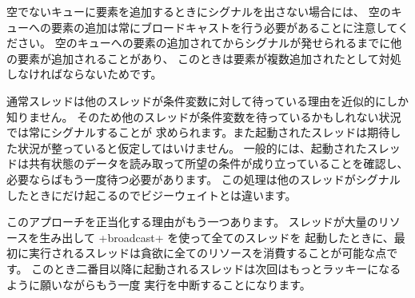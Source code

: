 空でないキューに要素を追加するときにシグナルを出さない場合には、
空のキューへの要素の追加は常にブロードキャストを行う必要があることに注意してください。
空のキューへの要素の追加されてからシグナルが発せられるまでに他の要素が追加されることがあり、
このときは要素が複数追加されたとして対処しなければならないためです。

通常スレッドは他のスレッドが条件変数に対して待っている理由を近似的にしか知りません。
そのため他のスレッドが条件変数を待っているかもしれない状況では常にシグナルすることが
求められます。また起動されたスレッドは期待した状況が整っていると仮定してはいけません。
一般的には、起動されたスレッドは共有状態のデータを読み取って所望の条件が成り立っていることを確認し、
必要ならばもう一度待つ必要があります。
この処理は他のスレッドがシグナルしたときにだけ起こるのでビジーウェイトとは違います。

このアプローチを正当化する理由がもう一つあります。
スレッドが大量のリソースを生み出して \ml+broadcast+ を使って全てのスレッドを
起動したときに、最初に実行されるスレッドは貪欲に全てのリソースを消費することが可能な点です。
このとき二番目以降に起動されるスレッドは次回はもっとラッキーになるように願いながらもう一度
実行を中断することになります。

